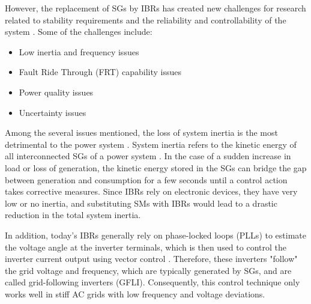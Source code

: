 
However, the replacement of SGs by IBRs has created new challenges for research
related to stability requirements and the reliability and controllability of the
system \cite{alam2020challenges}. Some of the challenges include:

\begin{itemize}
    \item Low inertia and frequency issues
    \item Fault Ride Through (FRT) capability issues
    \item Power quality issues
    \item Uncertainty issues
\end{itemize}

Among the several issues mentioned, the loss of system inertia is the most
detrimental to the power system \cite{alam2020challenges}. System inertia refers
to the kinetic energy of all interconnected SGs of a power
system \cite{denholm2020inertia}. In the case of a sudden increase in load or
loss of generation, the kinetic energy stored in the SGs can bridge the gap
between generation and consumption for a few seconds until a control action
takes corrective measures. Since IBRs rely on electronic devices, they have very
low or no inertia, and substituting SMs with IBRs would lead to a drastic
reduction in the total system inertia.

In addition, today's IBRs generally rely on phase-locked loops (PLLs) to
estimate the voltage angle at the inverter terminals, which is then used to
control the inverter current output using vector control \cite{ndreko2018grid}.
Therefore, these inverters "follow" the grid voltage and frequency, which are
typically generated by SGs, and are called grid-following inverters (GFLI).
Consequently, this control technique only works well in stiff AC grids with low
frequency and voltage deviations.

